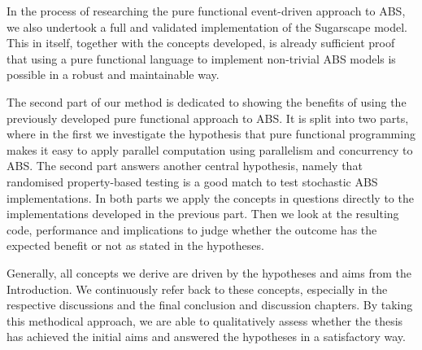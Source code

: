 In the process of researching the pure functional event-driven approach to ABS, we also undertook a full and validated implementation of the Sugarscape model. This in itself, together with the concepts developed, is already sufficient proof that using a pure functional language to implement non-trivial ABS models is possible in a robust and maintainable way.


The second part of our method is dedicated to showing the benefits of using the previously developed pure functional approach to ABS. It is split into two parts, where in the first we investigate the hypothesis that pure functional programming makes it easy to apply parallel computation using parallelism and concurrency to ABS. The second part answers another central hypothesis, namely that randomised property-based testing is a good match to test stochastic ABS implementations. In both parts we apply the concepts in questions directly to the implementations developed in the previous part. Then we look at the resulting code, performance and implications to judge whether the outcome has the expected benefit or not as stated in the hypotheses.

Generally, all concepts we derive are driven by the hypotheses and aims from the Introduction. We continuously refer back to these concepts, especially in the respective discussions and the final conclusion and discussion chapters. By taking this methodical approach, we are able to qualitatively assess whether the thesis has achieved the initial aims and answered the hypotheses in a satisfactory way.